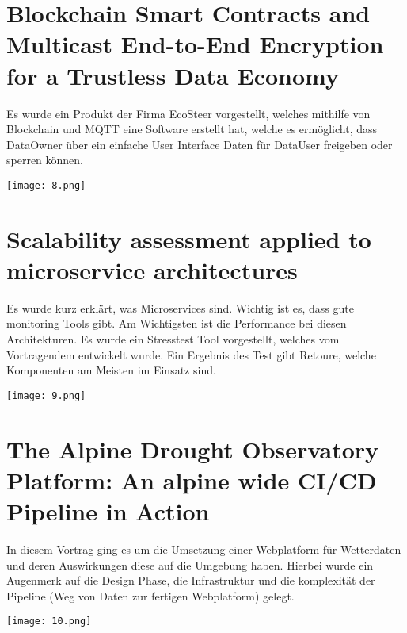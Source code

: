 \documentclass[10pt,ngerman]{scrartcl}
\begin{document}
\section*{Blockchain Smart Contracts and Multicast End-to-End Encryption for a Trustless Data Economy}
\begin{minipage}[b]{0.65\linewidth}
Es wurde ein Produkt der Firma EcoSteer vorgestellt, welches mithilfe von Blockchain und MQTT eine Software erstellt hat, welche es ermöglicht, dass DataOwner über ein einfache User Interface Daten für DataUser freigeben oder sperren können.
\end{minipage}
\hfill
\begin{minipage}[b]{0.35\linewidth}
\begin{flushright}
\texttt{[image: 8.png]}
\end{flushright}
\end{minipage}

\section*{Scalability assessment applied to microservice architectures}
\begin{minipage}[b]{0.65\linewidth}
Es wurde kurz erklärt, was Microservices sind. Wichtig ist es, dass gute monitoring Tools gibt. Am Wichtigsten ist die Performance bei diesen Architekturen. Es wurde ein Stresstest Tool vorgestellt, welches vom Vortragendem entwickelt wurde. Ein Ergebnis des Test gibt Retoure, welche Komponenten am Meisten im Einsatz sind.
\end{minipage}
\hfill
\begin{minipage}[b]{0.35\linewidth}
\begin{flushright}
\texttt{[image: 9.png]}
\end{flushright}
\end{minipage}

\section*{The Alpine Drought Observatory Platform: An alpine wide CI/CD Pipeline in Action}
\begin{minipage}[b]{0.65\linewidth}
In diesem Vortrag ging es um die Umsetzung einer Webplatform für Wetterdaten und deren Auswirkungen diese auf die Umgebung haben. Hierbei wurde ein Augenmerk auf die Design Phase, die Infrastruktur und die komplexität der Pipeline (Weg von Daten zur fertigen Webplatform) gelegt.
\end{minipage}
\hfill
\begin{minipage}[b]{0.35\linewidth}
\begin{flushright}
\texttt{[image: 10.png]}
\end{flushright}
\end{minipage}
\pagebreak
\end{document}
